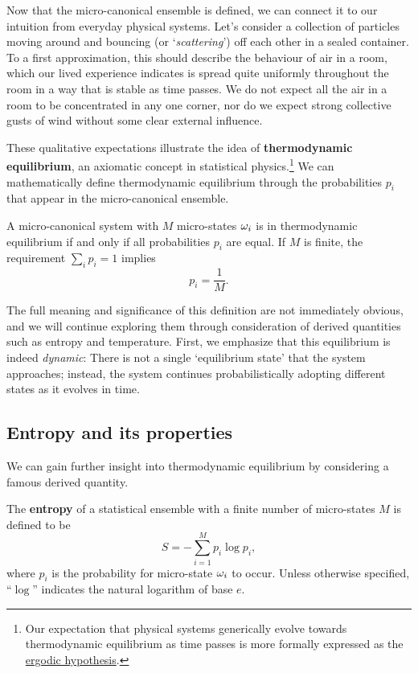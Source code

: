 Now that the micro-canonical ensemble is defined, we can connect it to our intuition from everyday physical systems.
Let's consider a collection of particles moving around and bouncing (or `\textit{scattering}') off each other in a sealed container.
To a first approximation, this should describe the behaviour of air in a room, which our lived experience indicates is spread quite uniformly throughout the room in a way that is stable as time passes.
We do not expect all the air in a room to be concentrated in any one corner, nor do we expect strong collective gusts of wind without some clear external influence.

These qualitative expectations illustrate the idea of \textbf{thermodynamic equilibrium}, an axiomatic concept in statistical physics.\footnote{Our expectation that physical systems generically evolve towards thermodynamic equilibrium as time passes is more formally expressed as the \href{https://en.wikipedia.org/wiki/Ergodic_hypothesis}{ergodic hypothesis}.}
We can mathematically define thermodynamic equilibrium through the probabilities $p_i$ that appear in the micro-canonical ensemble.

\begin{shaded}
  A micro-canonical system \Om with $M$ micro-states $\omega_i$ is in thermodynamic equilibrium if and only if all probabilities $p_i$ are equal.
  If $M$ is finite, the requirement $\sum_i p_i = 1$ implies
  \begin{equation}
    \label{eq:micro_equil}
    p_i = \frac{1}{M}.
  \end{equation}
\end{shaded}

The full meaning and significance of this definition are not immediately obvious, and we will continue exploring them through consideration of derived quantities such as entropy and temperature.
First, we emphasize that this equilibrium is indeed \textit{dynamic}: There is not a single `equilibrium state' that the system approaches; instead, the system continues probabilistically adopting different states as it evolves in time.



\subsection{Entropy and its properties}
We can gain further insight into thermodynamic equilibrium by considering a famous derived quantity.
\begin{shaded}
  The \textbf{entropy} of a statistical ensemble \Om with a finite number of micro-states $M$ is defined to be
  \begin{equation}
    \label{eq:entropy}
    S = - \sum_{i = 1}^M p_i \log p_i,
  \end{equation}
  where $p_i$ is the probability for micro-state $\omega_i$ to occur.
  Unless otherwise specified, ``$\log$'' indicates the natural logarithm of base $e$.
\end{shaded}

